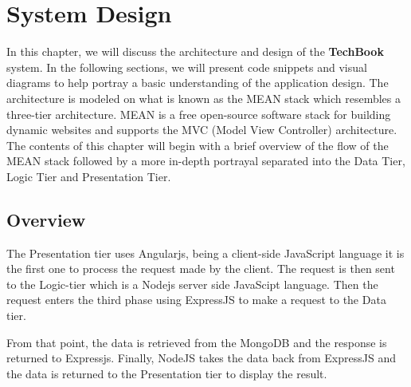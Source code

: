 \chapter{System Design}
In this chapter, we will discuss the architecture and design of the \textbf{TechBook} system. In the following sections, we will present code snippets and visual diagrams to help portray a basic understanding of the application design. The architecture is modeled on what is known as the MEAN stack which resembles a three-tier architecture. MEAN is a free open-source software stack for building dynamic websites and supports the MVC (Model View Controller) architecture. The contents of this chapter will begin with a brief overview of the flow of the MEAN stack followed by a more in-depth portrayal separated into the Data Tier, Logic Tier and Presentation Tier.

\section{Overview}
The Presentation tier uses Angularjs, being a client-side JavaScript language it is the first one to process the request made by the client. The request is then sent to the Logic-tier which is a Nodejs server side JavaScipt language. Then the request enters the third phase using ExpressJS to make a request to the Data tier.

From that point, the data is retrieved from the MongoDB and the response is returned to Expressjs. Finally, NodeJS takes the data back from ExpressJS and the data is returned to the Presentation tier to display the result.


